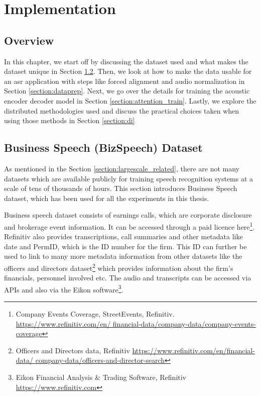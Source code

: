 \chapter{Implementation}
\label{chapter:methods}

\section{Overview}
In this chapter, we start off by discussing the dataset used and what makes the dataset unique in Section \ref{section:bizspeech}. Then, we look at how to make the data usable for an \acrshort{asr} application with steps like forced alignment and audio normalization in Section \ref{section:dataprep}. Next, we go over the details for training the acoustic encoder decoder model in Section \ref{section:attention_train}. Lastly, we explore the distributed methodologies used and discuss the practical choices taken when using those methods in Section \ref{section:di}

\section{Business Speech (BizSpeech) Dataset}
\label{section:bizspeech}
As mentioned in the Section \ref{section:largescale_related}, there are not many datasets which are available publicly for training speech recognition systems at a scale of tens of thousands of hours. This section introduces Business Speech dataset, which has been used for all the experiments in this thesis. 

Business speech dataset consists of earnings calls, which are corporate disclosure and brokerage event information. It can be accessed through a paid licence here\footnote{Company Events Coverage, StreetEvents, Refinitiv. \href{https://www.refinitiv.com/en/financial-data/company-data/company-events-coverage}{https://www.refinitiv.com/en/ financial-data/company-data/company-events-coverage}}. Refinitiv also provides transcriptions, call summaries and other metadata like date and PermID, which is the ID number for the firm. This ID can further be used to link to many more metadata information from other datasets like the officers and directors dataset\footnote{Officers and Directors data, Refinitiv \href{https://www.refinitiv.com/en/financial-data/company-data/officers-and-director-search}{https://www.refinitiv.com/en/financial-data/ company-data/officers-and-director-search}} which provides information about the firm's financials, personnel involved etc. The audio and transcripts can be accessed via APIs and also via the Eikon software\footnote{Eikon Financial Analysis \& Trading Software, Refinitiv \href{https://www.refinitiv.com/en/products/eikon-trading-software}{https://www.refinitiv.com}}. 

